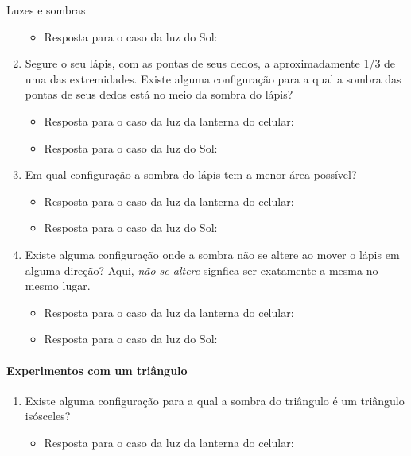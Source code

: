 \begin{task}{Luzes e sombras}
\begin{enumerate}
\begin{itemize}
\item {} 
Resposta para o caso da luz do Sol:

\end{itemize}

\item {} 
Segure o seu lápis, com as pontas de seus dedos, a aproximadamente 1/3 de uma das extremidades. Existe alguma configuração para a qual a sombra das pontas de seus dedos está no meio da sombra do lápis?
\begin{itemize}
\item {} 
Resposta para o caso da luz da lanterna do celular:

\item {} 
Resposta para o caso da luz do Sol:

\end{itemize}

\item {} 
Em qual configuração a sombra do lápis tem a menor área possível?
\begin{itemize}
\item {} 
Resposta para o caso da luz da lanterna do celular:

\item {} 
Resposta para o caso da luz do Sol:

\end{itemize}

\item {} 
Existe alguma configuração onde a sombra não se altere ao mover o lápis em alguma direção? Aqui, \emph{não se altere} signfica ser exatamente a mesma no mesmo lugar.
\begin{itemize}
\item {} 
Resposta para o caso da luz da lanterna do celular:

\item {} 
Resposta para o caso da luz do Sol:

\end{itemize}

\end{enumerate}

\paragraph{Experimentos com um triângulo}
\begin{enumerate}
\item {} 
Existe alguma configuração para a qual a sombra do triângulo é um triângulo isósceles?
\begin{itemize}
\item {} 
Resposta para o caso da luz da lanterna do celular:


\end{itemize}
\end{enumerate}
\end{task}
